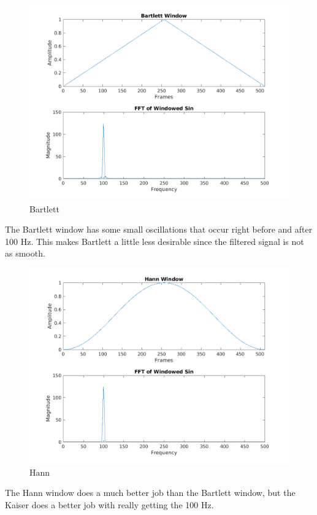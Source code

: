 \documentclass[11pt, a4paper]{article}
\begin{document}
\begin{figure}[H]
    \centering
    \includegraphics[width=.8\textwidth]{bartlett-sin.png}
    \caption{Bartlett}
\end{figure}

The Bartlett window has some small oscillations that occur right before and after 100 Hz. This makes Bartlett a little less desirable since the filtered signal is not as smooth.

\begin{figure}[H]
    \centering
    \includegraphics[width=.8\textwidth]{hann-sin.png}
    \caption{Hann}
\end{figure}

The Hann window does a much better job than the Bartlett window, but the Kaiser does a better job with really getting the 100 Hz. 
\end{document}
